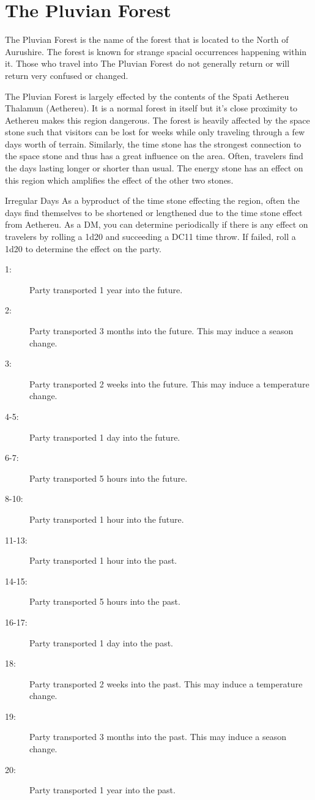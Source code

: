 \section{The Pluvian Forest}

The Pluvian Forest is the name of the forest that is located to the North of Aurushire. The forest is known for strange spacial occurrences happening within it. Those who travel into The Pluvian Forest do not generally return or will return very confused or changed.

The Pluvian Forest is largely effected by the contents of the Spati Aethereu Thalamun (Aethereu). It is a normal forest in itself but it's close proximity to Aethereu makes this region dangerous. The forest is heavily affected by the space stone such that visitors can be lost for weeks while only traveling through a few days worth of terrain. Similarly, the time stone has the strongest connection to the space stone and thus has a great influence on the area. Often, travelers find the days lasting longer or shorter than usual. The energy stone has an effect on this region which amplifies the effect of the other two stones.

\begin{commentbox}{Irregular Days}
	As a byproduct of the time stone effecting the region, often the days find themselves to be shortened or lengthened due to the time stone effect from Aethereu. As a DM, you can determine periodically if there is any effect on travelers by rolling a 1d20 and succeeding a DC11 time throw. If failed, roll a 1d20 to determine the effect on the party.
	\hline
	\begin{description}
		\item[1:] Party transported 1 year into the future. 
		\item[2:] Party transported 3 months into the future. This may induce a season change. 
		\item[3:] Party transported 2 weeks into the future. This may induce a temperature change.
		\item[4-5:] Party transported 1 day into the future. 
		\item[6-7:] Party transported 5 hours into the future. 
		\item[8-10:] Party transported 1 hour into the future. 
		\item[11-13:] Party transported 1 hour into the past. 
		\item[14-15:] Party transported 5 hours into the past. 
		\item[16-17:] Party transported 1 day into the past. 
		\item[18:] Party transported 2 weeks into the past. This may induce a temperature change. 
		\item[19:] Party transported 3 months into the past. This may induce a season change. 
		\item[20:] Party transported 1 year into the past. 
	\end{description}
\end{commentbox}

